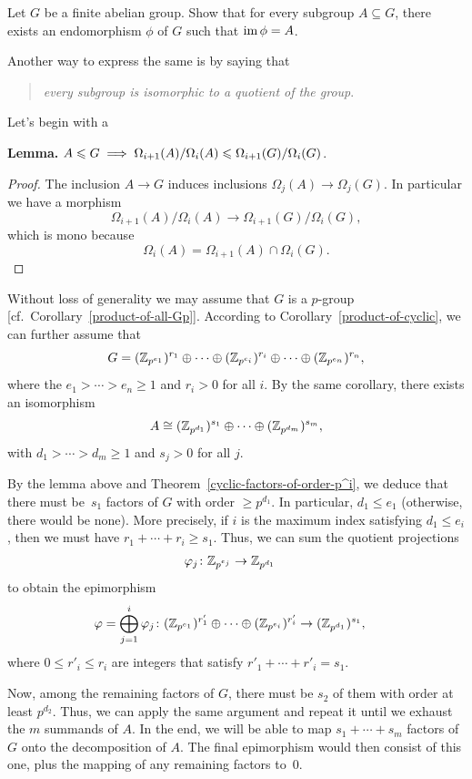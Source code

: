 \begin{exr}
    Let\/ $G$ be a finite abelian group. Show that for every subgroup\/ $A \subseteq G$, there exists an endomorphism\/ $\phi$ of\/ $G$ such that\/ $\operatorname{im}\phi = A$.    
\end{exr}

\begin{solution} Another way to express the same is by saying that 

\begin{quote}
    \textit{every subgroup is isomorphic to a quotient of the group}.
\end{quote}
Let's begin with a 

\textbf{Lemma.} $A\leqslant G\implies
    \Omega_{i+1}(A)/\Omega_i(A)\leqslant\Omega_{i+1}(G)/\Omega_i(G)$.

{\small \begin{proof} The inclusion $A\to G$ induces inclusions $\Omega_j(A)\to\Omega_j(G)$. In particular we have a morphism
$$
    \Omega_{i+1}(A)/\Omega_i(A)\to\Omega_{i+1}(G)/\Omega_i(G),
$$
which is mono because
$$
    \Omega_i(A) = \Omega_{i+1}(A)\cap\Omega_i(G).
$$
 \end{proof}}

\medskip

Without loss of generality we may assume that $G$ is a $p$-group [cf.~Corollary~\ref{product-of-all-Gp}]. According to Corollary~\ref{product-of-cyclic}, we can further assume that
$$
    G=(\mathbb{Z}_{p^{e_1}})^{r_1}\oplus\cdots
        \oplus(\mathbb{Z}_{p^{e_i}})^{r_i}\oplus\cdots\oplus(\mathbb{Z}_{p^{e_n}})^{r_n},
$$
where the $e_1>\cdots>e_n\ge1$ and $r_i>0$ for all $i$. By the same corollary, there exists an isomorphism
$$
    A\cong(\mathbb{Z}_{p^{d_1}})^{s_1}\oplus\cdots\oplus(\mathbb{Z}_{p^{d_m}})^{s_m},
$$
with $d_1>\cdots>d_m\ge1$ and $s_j>0$ for all $j$.

By the lemma above and Theorem~\ref{cyclic-factors-of-order-p^i}, we deduce that there must be~$s_1$ factors of $G$ with order $\ge p^{d_1}$. In particular, $d_1\le e_1$ (otherwise, there would be none). More precisely, if $i$ is the maximum index satisfying $d_1\le e_i$, then we must have $r_1+\cdots+r_i\ge s_1$. Thus, we can sum the quotient projections
\begin{align*}
    \varphi_j\colon\mathbb{Z}_{p^{e_j}}&\to\mathbb{Z}_{p^{d_1}}
\end{align*}
to obtain the epimorphism
\begin{align*}
    \varphi=\bigoplus_{j=1}^i\varphi_j\colon
        (\mathbb{Z}_{p^{e_1}})^{r'_1}\oplus\cdots
            \oplus(\mathbb{Z}_{p^{e_i}})^{r'_i}
        &\to(\mathbb{Z}_{p^{d_1}})^{s_1},
\end{align*}
where $0\le r'_i\le r_i$ are integers that satisfy $r'_1+\cdots+r'_i=s_1$.

Now, among the remaining factors of $G$, there must be $s_2$ of them with order at least $p^{d_2}$. Thus, we can apply the same argument and repeat it until we exhaust the $m$ summands of $A$. In the end, we will be able to map $s_1+\cdots+s_m$ factors of $G$ onto the decomposition of $A$. The final epimorphism would then consist of this one, plus the mapping of any remaining factors to~$0$.  \end{solution}

